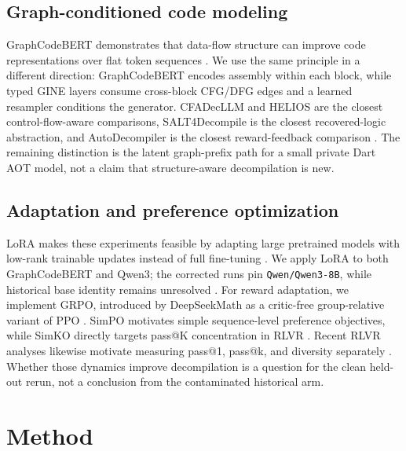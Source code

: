 \documentclass[11pt]{article}
\begin{document}
\subsection{Graph-conditioned code modeling}

GraphCodeBERT demonstrates that data-flow structure can improve code representations over flat token sequences \cite{guo2020graphcodebert}. We use the same principle in a different direction: GraphCodeBERT encodes assembly within each block, while typed GINE layers consume cross-block CFG/DFG edges and a learned resampler conditions the generator. CFADecLLM and HELIOS are the closest control-flow-aware comparisons, SALT4Decompile is the closest recovered-logic abstraction, and AutoDecompiler is the closest reward-feedback comparison \cite{liu2025cfadecllm,achamyeleh2026helios,wang2025salt4decompile,liu2026autodecompiler}. The remaining distinction is the latent graph-prefix path for a small private Dart AOT model, not a claim that structure-aware decompilation is new.

\subsection{Adaptation and preference optimization}

LoRA makes these experiments feasible by adapting large pretrained models with low-rank trainable updates instead of full fine-tuning \cite{hu2021lora}. We apply LoRA to both GraphCodeBERT and Qwen3; the corrected runs pin \texttt{Qwen/Qwen3-8B}, while historical base identity remains unresolved \cite{yang2025qwen3}. For reward adaptation, we implement GRPO, introduced by DeepSeekMath as a critic-free group-relative variant of PPO \cite{shao2024deepseekmath}. SimPO motivates simple sequence-level preference objectives, while SimKO directly targets pass@K concentration in RLVR \cite{meng2024simpo,peng2025simko}. Recent RLVR analyses likewise motivate measuring pass@1, pass@k, and diversity separately \cite{yue2025rlvr}. Whether those dynamics improve decompilation is a question for the clean held-out rerun, not a conclusion from the contaminated historical arm.

\section{Method}
\end{document}
